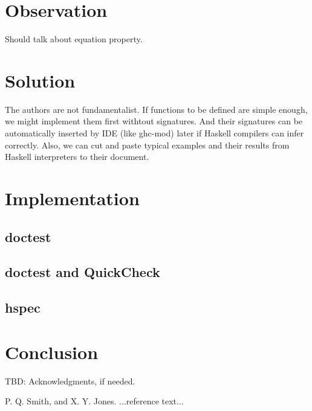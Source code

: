\documentclass[preprint]{sigplanconf}
\begin{document}
\section{Observation}

Should talk about equation property.

\section{Solution}

The authors are not fundamentalist.
If functions to be defined are simple enough,
we might implement them first withtout signatures.
And their signatures can be automatically
inserted by IDE (like ghc-mod) later
if Haskell compilers can infer correctly.
Also, we can cut and paste typical examples and their results
from Haskell interpreters to their document.

\section{Implementation}

\subsection{doctest}

\subsection{doctest and QuickCheck}

\subsection{hspec}

\section{Conclusion}



\acks

TBD: Acknowledgments, if needed.





\begin{thebibliography}{}
\softraggedright

P. Q. Smith, and X. Y. Jones. ...reference text...

\end{thebibliography}
\end{document}
